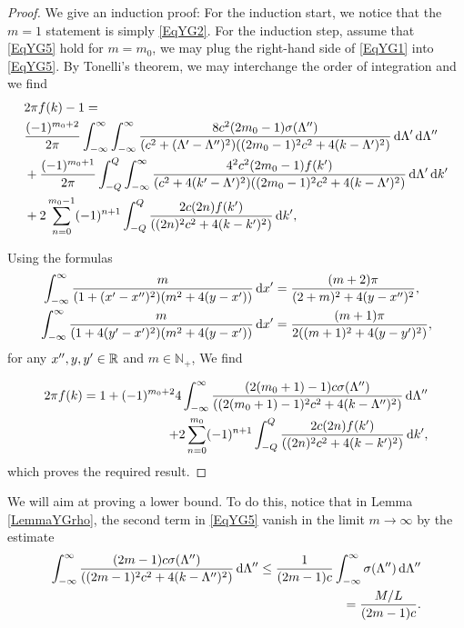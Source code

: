 \begin{proof}
	We give an induction proof: For the induction start, we notice that the $ m=1 $ statement is simply \eqref{EqYG2}. For the induction step, assume that \eqref{EqYG5} hold for $ m=m_0 $, we may plug the right-hand side of \eqref{EqYG1} into \eqref{EqYG5}. By Tonelli's theorem, we may interchange the order of integration and we find\begin{equation}
	\begin{aligned}
	&2\pi  f(k)-1=\\
	&\frac{(-1)^{m_0+2}}{2\pi}\int_{-\infty}^{\infty}\int_{-\infty}^{\infty}\frac{8c^2(2m_0-1)\sigma(\Lambda'')}{(c^2+(\Lambda'-\Lambda'')^2)((2m_0-1)^2c^2+4(k-\Lambda')^2)}\mathop{}\!\mathrm{d}\Lambda'\mathop{}\!\mathrm{d}\Lambda''\\
	&+\frac{(-1)^{m_0+1}}{2\pi}\int_{-Q}^{Q}\int_{-\infty}^{\infty}\frac{4^2c^2(2m_0-1) f(k')}{(c^2+4(k'-\Lambda')^2)((2m_0-1)^2c^2+4(k-\Lambda')^2)}\mathop{}\!\mathrm{d}\Lambda'\mathop{}\!\mathrm{d} k'\\
	&+2\sum_{n=0}^{m_0-1}(-1)^{n+1}\int_{-Q}^{Q}\frac{2c(2n) f(k')}{((2n)^2c^2+4(k-k')^2)}\mathop{}\!\mathrm{d} k',
	\end{aligned}
	\end{equation}
	
	Using the formulas
	\begin{align}
	\int_{-\infty}^{\infty}\frac{m}{(1+(x'-x'')^2)(m^2+4(y-x'))}\mathop{}\!\mathrm{d} x'&=\frac{(m+2)\pi}{(2+m)^2+4(y-x'')^2},\\
	\int_{-\infty}^{\infty}\frac{m}{(1+4(y'-x')^2)(m^2+4(y-x'))}\mathop{}\!\mathrm{d} x'&=\frac{(m+1)\pi}{2((m+1)^2+4(y-y')^2)},
	\end{align}
	for any $ x'',y,y'\in\mathbb{R} $ and $ m\in\mathbb{N}_+ $,
	We find 
	
	\begin{equation}
	\begin{aligned}
	2\pi  f(k)=1+(-1)^{m_0+2}4\int_{-\infty}^{\infty}\frac{ (2(m_0+1)-1)c\sigma(\Lambda'')}{((2(m_0+1)-1)^2 c^2+4(k-\Lambda'')^2)}\mathop{}\!\mathrm{d}\Lambda''\\
	+2\sum_{n=0}^{m_0}(-1)^{n+1}\int_{-Q}^{Q}\frac{2c(2n) f(k')}{((2n)^2c^2+4(k-k')^2)}\mathop{}\!\mathrm{d} k',
	\end{aligned}
	\end{equation}
	which proves the required result.
\end{proof}
We will aim at proving a lower bound. To do this, notice that in Lemma \ref{LemmaYGrho}, the second term in \eqref{EqYG5} vanish in the limit $ m\to\infty $ by the estimate \begin{equation}\label{EqYGLemma1bound}
	\begin{aligned}
	\int_{-\infty}^{\infty}\frac{ (2m-1)c\sigma(\Lambda'')}{((2m-1)^2 c^2+4(k-\Lambda'')^2)}\mathop{}\!\mathrm{d}\Lambda''\leq \frac{1}{(2m-1)c}\int_{-\infty}^{\infty}\sigma(\Lambda'')\mathop{}\!\mathrm{d} \Lambda''\\=\frac{M/L}{(2m-1)c}.
	\end{aligned}
	\end{equation}
